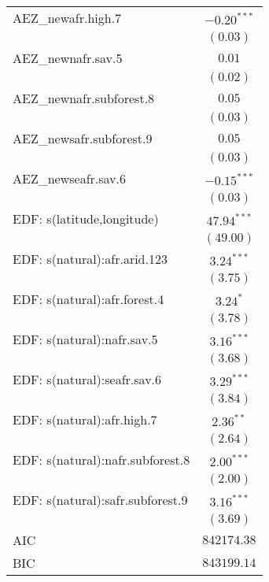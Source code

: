 \begin{longtable}{l c}
AEZ\_newafr.high.7               & $-0.20^{***}$  \\
                                 & $(0.03)$       \\
AEZ\_newnafr.sav.5               & $0.01$         \\
                                 & $(0.02)$       \\
AEZ\_newnafr.subforest.8         & $0.05$         \\
                                 & $(0.03)$       \\
AEZ\_newsafr.subforest.9         & $0.05$         \\
                                 & $(0.03)$       \\
AEZ\_newseafr.sav.6              & $-0.15^{***}$  \\
                                 & $(0.03)$       \\
EDF: s(latitude,longitude)       & $47.94^{***}$  \\
                                 & $(49.00)$      \\
EDF: s(natural):afr.arid.123     & $3.24^{***}$   \\
                                 & $(3.75)$       \\
EDF: s(natural):afr.forest.4     & $3.24^{*}$     \\
                                 & $(3.78)$       \\
EDF: s(natural):nafr.sav.5       & $3.16^{***}$   \\
                                 & $(3.68)$       \\
EDF: s(natural):seafr.sav.6      & $3.29^{***}$   \\
                                 & $(3.84)$       \\
EDF: s(natural):afr.high.7       & $2.36^{**}$    \\
                                 & $(2.64)$       \\
EDF: s(natural):nafr.subforest.8 & $2.00^{***}$   \\
                                 & $(2.00)$       \\
EDF: s(natural):safr.subforest.9 & $3.16^{***}$   \\
                                 & $(3.69)$       \\
\hline
AIC                              & $842174.38$    \\
BIC                              & $843199.14$    \\

\end{longtable}
